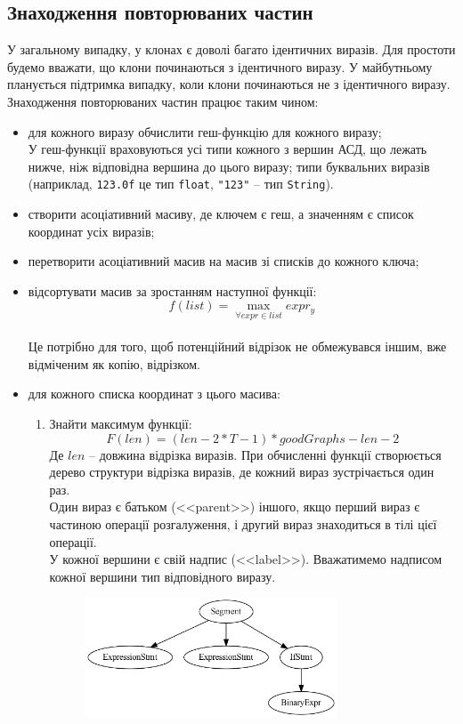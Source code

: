\documentclass[a4paper, 14pt]{article}
\begin{document}
\subsection{Знаходження повторюваних частин}
У загальному випадку, у клонах є доволі багато ідентичних виразів. Для простоти будемо вважати, що клони починаються з ідентичного виразу. У майбутньому планується підтримка випадку, коли клони починаються не з ідентичного виразу. \\
Знаходження повторюваних частин працює таким чином:
\begin{itemize}
\item для кожного виразу обчислити геш-функцію для кожного виразу;\\
У геш-функції враховуються усі типи кожного з вершин АСД, що лежать нижче, ніж відповідна вершина до цього виразу; типи буквальних виразів (наприклад, \verb|123.0f| це тип \verb|float|, \verb|"123"| -- тип \verb|String|).
\item{створити асоціативний масиву, де ключем є геш, а значенням є список координат усіх виразів;}
\item{перетворити асоціативний масив на масив зі списків до кожного ключа;}
\item{відсортувати масив за зростанням наступної функції: $$f(list)=\max_{\forall expr \in list}{expr_{y}} $$ \\
Це потрібно для того, щоб потенційний відрізок не обмежувався іншим, вже відміченим як копію, відрізком.}
\item{для кожного списка координат з цього масива: 
\begin{enumerate}
\item{Знайти максимум функції: $$F(len)=(len-2*T-1)*goodGraphs-len-2$$
Де $len$ -- довжина відрізка виразів. При обчисленні функції створюється дерево структури відрізка виразів, де кожний вираз зустрічається один раз. \\
Один вираз є батьком (<<parent>>) іншого, якщо перший вираз є частиною операції розгалуження, і другий вираз знаходиться в тілі цієї операції. \\
У кожної вершини є свій надпис (<<label>>). Вважатимемо надписом кожної вершини тип відповідного виразу. \\
\begin{figure}[h]
    \centering
    \includegraphics[width=0.75\textwidth]{function_graph_example}

\end{figure}}
\end{enumerate}}
\end{itemize}
\end{document}
